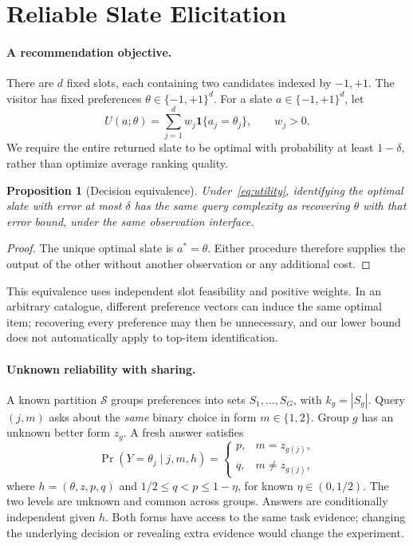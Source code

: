 \documentclass[sigconf,anonymous,review]{acmart}
\newtheorem{proposition}[theorem]{Proposition}
\newcommand{\ind}{\mathbf 1}
\begin{document}
\section{Reliable Slate Elicitation}
\paragraph{A recommendation objective.}
There are $d$ fixed slots, each containing two candidates indexed by $-1,+1$. The visitor has fixed preferences $\theta\in\{-1,+1\}^d$. For a slate $a\in\{-1,+1\}^d$, let
\begin{equation}\label{eq:utility}
 U(a;\theta)=\sum_{j=1}^d w_j\ind\{a_j=\theta_j\},\qquad w_j>0.
\end{equation}
We require the entire returned slate to be optimal with probability at least $1-\delta$, rather than optimize average ranking quality.
\begin{proposition}[Decision equivalence]\label{prop:slate}
Under~\eqref{eq:utility}, identifying the optimal slate with error at most $\delta$ has the same query complexity as recovering $\theta$ with that error bound, under the same observation interface.
\end{proposition}
\begin{proof}
The unique optimal slate is $a^*=\theta$. Either procedure therefore supplies the output of the other without another observation or any additional cost.
\end{proof}
This equivalence uses independent slot feasibility and positive weights. In an arbitrary catalogue, different preference vectors can induce the same optimal item; recovering every preference may then be unnecessary, and our lower bound does not automatically apply to top-item identification.

\paragraph{Unknown reliability with sharing.}
A known partition $\mathcal S$ groups preferences into sets $S_1,\ldots,S_G$, with $k_g=|S_g|$. Query $(j,m)$ asks about the \emph{same} binary choice in form $m\in\{1,2\}$. Group $g$ has an unknown better form $z_g$. A fresh answer satisfies
\begin{equation}\label{eq:channel}
 \Pr(Y=\theta_j\mid j,m,h)=
 \begin{cases}p,&m=z_{g(j)},\\q,&m\ne z_{g(j)},\end{cases}
\end{equation}
where $h=(\theta,z,p,q)$ and $1/2\le q<p\le1-\eta$, for known $\eta\in(0,1/2)$. The two levels are unknown and common across groups. Answers are conditionally independent given $h$. Both forms have access to the same task evidence; changing the underlying decision or revealing extra evidence would change the experiment.
\end{document}
